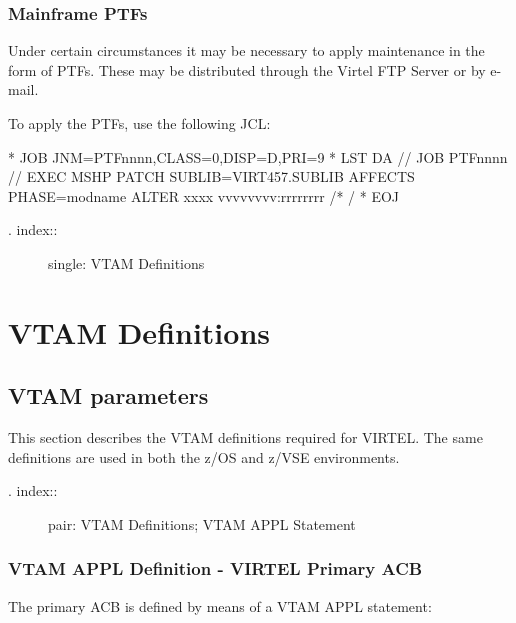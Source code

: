 \documentclass[letterpaper,10pt,english]{sphinxmanual}
\begin{document}
\subsection{Mainframe PTFs}
\label{\detokenize{Installation_Guide:mainframe-ptfs}}
Under certain circumstances it may be necessary to apply maintenance in the form of PTFs. These may be distributed through the Virtel FTP Server or by e-mail.

To apply the PTFs, use the following JCL:

\begin{sphinxVerbatim}[commandchars=\\\{\}]
* \PYGZdl{}\PYGZdl{} JOB JNM=PTFnnnn,CLASS=0,DISP=D,PRI=9
* \PYGZdl{}\PYGZdl{} LST DA
// JOB PTFnnnn
// EXEC MSHP
  PATCH SUBLIB=VIRT457.SUBLIB
  AFFECTS PHASE=modname
  ALTER xxxx vvvvvvvv:rrrrrrrr
/*
/\PYGZam{}
* \PYGZdl{}\PYGZdl{} EOJ
\end{sphinxVerbatim}

\begin{description}
\item[{. index::}] \leavevmode
single: VTAM Definitions

\end{description}


\chapter{VTAM Definitions}
\label{\detokenize{Installation_Guide:vtam-definitions}}

\section{VTAM parameters}
\label{\detokenize{Installation_Guide:vtam-parameters}}
This section describes the VTAM definitions required for VIRTEL. The same definitions are used in both the z/OS and z/VSE environments.
\begin{description}
\item[{. index::}] \leavevmode
pair: VTAM Definitions; VTAM APPL Statement

\end{description}


\subsection{VTAM APPL Definition - VIRTEL Primary ACB}
\label{\detokenize{Installation_Guide:vtam-appl-definition-virtel-primary-acb}}
The primary ACB is defined by means of a VTAM APPL statement:
\end{document}
